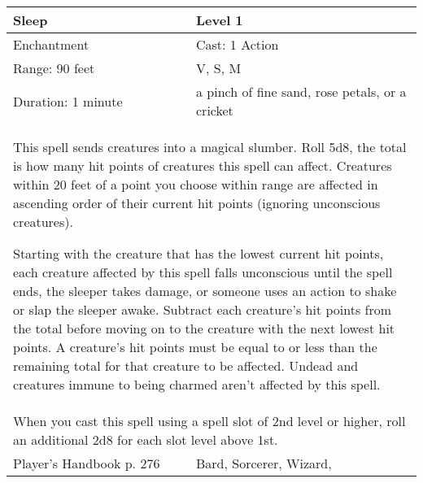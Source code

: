 \documentclass[11pt]{report}
\begin{document}
\begin{table}[H]
	\begin{tabular}{||p{6cm}|p{6cm}||}
		\hline\hline
		\bf{Sleep} & Level 1\\ \hline
		Enchantment & Cast: 1 Action\\ \hline
		Range: 90 feet & V, S, M\\ \hline
		Duration: 1 minute & a pinch of fine sand, rose petals, or a cricket\\ \hline
		\multicolumn{2}{||p{12cm}||}{This spell sends creatures into a magical slumber. Roll 5d8, the total is how many hit points of creatures this spell can affect. Creatures within 20 feet of a point you choose within range are affected in ascending order of their current hit points (ignoring unconscious creatures).

Starting with the creature that has the lowest current hit points, each creature affected by this spell falls unconscious until the spell ends, the sleeper takes damage, or someone uses an action to shake or slap the sleeper awake. Subtract each creature’s hit points from the total before moving on to the creature with the next lowest hit points. A creature’s hit points must be equal to or less than the remaining total for that creature to be affected.
Undead and creatures immune to being charmed aren’t affected by this spell.}\\ \hline
		\multicolumn{2}{||p{12cm}||}{When you cast this spell using a spell slot of 2nd level or higher, roll an additional 2d8 for each slot level above 1st.}\\ \hline
Player's Handbook p. 276 & Bard, Sorcerer, Wizard, \\ \hline\hline
	\end{tabular}
\end{table}
\end{document}
